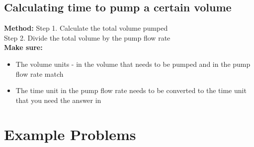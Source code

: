 \subsection{Calculating time to pump a certain volume}
\textbf{Method:}
\hspace{1cm}Step 1. Calculate the total volume pumped\\
\hspace{1cm}Step 2.	Divide the total volume by the pump flow rate\\
\textbf{Make sure:}
\begin{itemize}
\item The volume units - in the volume that needs to be pumped and in the pump flow rate match
\item The time unit in the pump flow rate needs to be converted to the time unit that you need the answer in
\end{itemize}

\section{Example Problems}

